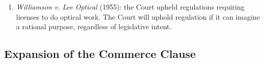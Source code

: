 \begin{enumerate}
    ``rest upon some \textbf{rational basis}.''\footnote{Casebook p. 515.} 
    \begin{enumerate}
        \item \textbf{Footnote four}: the Court should apply heightened 
        scrutiny to provisions that (1) facially violate constitutional 
        provisions, (2) distorts political processes, or (3) affects discrete 
        and insular minorities.\footnote{Casebook p. 515.}
    \end{enumerate}
    \item \emph{Williamson v. Lee Optical} (1955): the Court upheld 
    regulations requiring licenses to do optical work. The Court will uphold 
    regulation if it can imagine a rational purpose, regardless of legislative 
    intent.
\end{enumerate}

\subsection{Expansion of the Commerce Clause}

